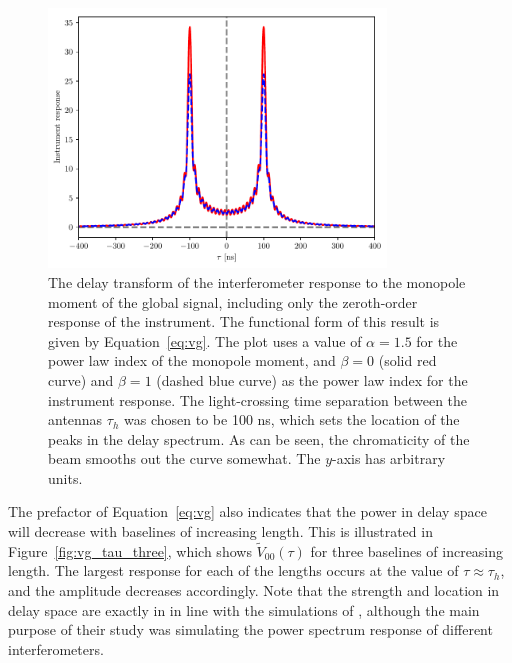 \begin{figure}
\centering
\includegraphics[width=0.8\textwidth]{chapters/global_signal/figures/vg.pdf}
\caption[The delay transform of the interferometer response to the monopole
    moment of the global signal, including only the zeroth-order response of the
    instrument.]{The delay transform of the interferometer response to the monopole
    moment of the global signal, including only the zeroth-order response of the
    instrument. The functional form of this result is given by
    Equation~\ref{eq:vg}. The plot uses a value of $\alpha = 1.5$ for the
    power law index of the monopole moment, and $\beta = 0$ (solid red curve)
    and $\beta = 1$ (dashed blue curve) as the power law index for the
    instrument response. The light-crossing time separation between the antennas
    $\tau_h$ was chosen to be 100 ns, which sets the location of the peaks in
    the delay spectrum. As can be seen, the chromaticity of the beam smooths out
    the curve somewhat. The $y$-axis has arbitrary units.}
\label{fig:vg_tau}
\end{figure}

The prefactor of Equation~\ref{eq:vg} also indicates that the power in delay space will decrease with baselines of increasing length. This is illustrated in Figure~\ref{fig:vg_tau_three}, which shows $\tilde{V}_{00}(\tau)$ for three baselines of increasing length. The largest response for each of the lengths occurs at the value of $\tau\approx\tau_h$, and the amplitude decreases accordingly. Note that the strength and location in delay space are exactly in in line with the simulations of \cite[][see their Figure 2]{Nithya.15b}, although the main purpose of their study was simulating the power spectrum response of different interferometers.

